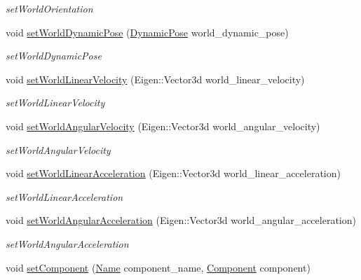 \begin{DoxyCompactItemize}
\begin{DoxyCompactList}\small\item\em set\+World\+Orientation \end{DoxyCompactList}\item 
void \hyperlink{classrobotis__manipulator_1_1_manipulator_a15476bd6ca87081029c96dd8c6bad319}{set\+World\+Dynamic\+Pose} (\hyperlink{structrobotis__manipulator_1_1_dynamic_pose}{Dynamic\+Pose} world\+\_\+dynamic\+\_\+pose)
\begin{DoxyCompactList}\small\item\em set\+World\+Dynamic\+Pose \end{DoxyCompactList}\item 
void \hyperlink{classrobotis__manipulator_1_1_manipulator_a9d842b9fc11e76aad985b86b4814caf5}{set\+World\+Linear\+Velocity} (Eigen\+::\+Vector3d world\+\_\+linear\+\_\+velocity)
\begin{DoxyCompactList}\small\item\em set\+World\+Linear\+Velocity \end{DoxyCompactList}\item 
void \hyperlink{classrobotis__manipulator_1_1_manipulator_a8fb7188e96d33514a8e5205c79d9b0fc}{set\+World\+Angular\+Velocity} (Eigen\+::\+Vector3d world\+\_\+angular\+\_\+velocity)
\begin{DoxyCompactList}\small\item\em set\+World\+Angular\+Velocity \end{DoxyCompactList}\item 
void \hyperlink{classrobotis__manipulator_1_1_manipulator_a6907a02ab76092769a74f1197bedd381}{set\+World\+Linear\+Acceleration} (Eigen\+::\+Vector3d world\+\_\+linear\+\_\+acceleration)
\begin{DoxyCompactList}\small\item\em set\+World\+Linear\+Acceleration \end{DoxyCompactList}\item 
void \hyperlink{classrobotis__manipulator_1_1_manipulator_a456c183bce6514a5b5c1b1524c5033ac}{set\+World\+Angular\+Acceleration} (Eigen\+::\+Vector3d world\+\_\+angular\+\_\+acceleration)
\begin{DoxyCompactList}\small\item\em set\+World\+Angular\+Acceleration \end{DoxyCompactList}\item 
void \hyperlink{classrobotis__manipulator_1_1_manipulator_a3592945e556a0762c4d306817f3d700f}{set\+Component} (\hyperlink{namespacerobotis__manipulator_a08c2d25e77a01ad75b9bb740f8ce4765}{Name} component\+\_\+name, \hyperlink{structrobotis__manipulator_1_1_component}{Component} component)

\end{DoxyCompactItemize}
